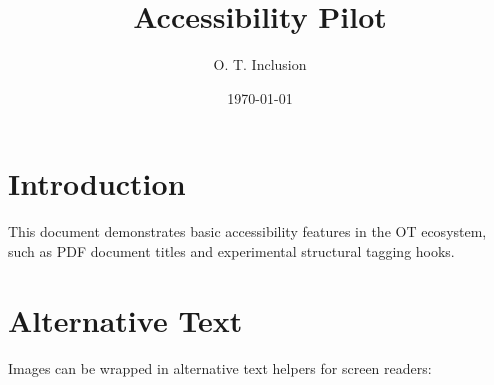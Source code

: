 \documentclass{otbook}
\title{Accessibility Pilot}
\author{O. T. Inclusion}
\date{\today}
\begin{document}
\makeotbooktitle

\section{Introduction}

This document demonstrates basic accessibility features in the OT ecosystem, such as PDF document titles and experimental structural tagging hooks.

\section{Alternative Text}

Images can be wrapped in alternative text helpers for screen readers:

\begin{center}
\end{center}
\end{document}
